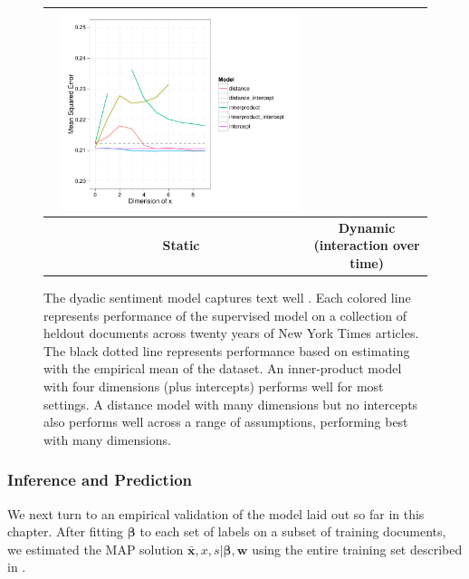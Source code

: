 \begin{figure}
\begin{tabular}{|c|c|c|}
  & \includegraphics[height=0.27\textheight]{chapter_foreign_relations/figures/010_dynamic_model_results.pdf}
  \\
\hline
 & \textbf{Static} & \textbf{Dynamic (interaction over time)} \\
\hline
\end{tabular}
  \label{fig:fr_supervised_performance}
  \caption{The dyadic sentiment model captures text well . Each
    colored line represents performance of the supervised model on a
    collection of heldout documents across twenty years of New York
    Times articles. The black dotted line represents performance based
    on estimating with the empirical mean of the dataset.  An
    inner-product model with four dimensions (plus intercepts)
    performs well for most settings.  A distance model with many
    dimensions but no intercepts also performs well across a range of
    assumptions, performing best with many dimensions.}
\end{figure}

\subsubsection{Inference and Prediction}
We next turn to an empirical validation of the model laid out so far
in this chapter. After fitting $\bm \beta$ to each set of labels on a subset
of training documents, we estimated the MAP solution $\bm \bar x, x, s
| \bm \beta, \bm w$ using the entire training set described in
.

